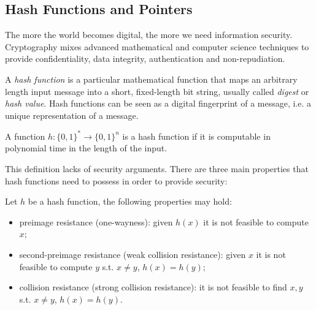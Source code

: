 \subsection{Hash Functions and Pointers}
The more the world becomes digital, the more we need information security. Cryptography mixes advanced mathematical and computer science techniques to provide confidentiality, data integrity, authentication and non-repudiation.

\bigskip
\noindent
A \textit{hash function} is a particular mathematical function that maps an arbitrary length input message into a short, fixed-length bit string, usually called \textit{digest} or \textit{hash value}. Hash functions can be seen as a digital fingerprint of a message, i.e. a unique representation of a message.

\begin{mydef}
    \label{def:hash}
	A function $h : \{ 0, 1 \} ^* \rightarrow \{ 0, 1 \} ^n $ is a hash function if it is computable in polynomial time in the length of the input.
\end{mydef}

\bigskip
\noindent
This definition lacks of security arguments. There are three main properties that hash functions need to possess in order to provide security:
\begin{mydef}
	\label{hash-prop}
	Let $h$ be a hash function, the following properties may hold:
	\begin{itemize}
		\item preimage resistance (one-wayness): given $h(x)$ it is not feasible to compute $x$;
		\item second-preimage resistance (weak collision resistance): given $x$ it is not feasible to compute $y$ s.t. $x \neq y$, $h(x)=h(y)$;
		\item collision resistance (strong collision resistance): it is not feasible to find $x, y$ s.t. $x \neq y$, $h(x)=h(y)$.
	\end{itemize}
\end{mydef}

